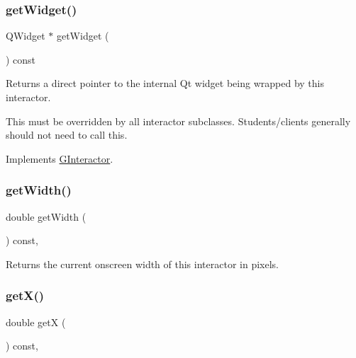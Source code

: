\subsubsection{\texorpdfstring{get\+Widget()}{getWidget()}}
{\footnotesize\ttfamily Q\+Widget $\ast$ get\+Widget (\begin{DoxyParamCaption}{ }\end{DoxyParamCaption}) const\hspace{0.3cm}{\ttfamily [virtual]}}



Returns a direct pointer to the internal Qt widget being wrapped by this interactor. 

This must be overridden by all interactor subclasses. Students/clients generally should not need to call this. 

Implements \mbox{\hyperlink{classGInteractor}{G\+Interactor}}.

\mbox{\label{classGInteractor_a0ed2965abd4f5701d2cadf71239faf19}} 
\subsubsection{\texorpdfstring{get\+Width()}{getWidth()}}
{\footnotesize\ttfamily double get\+Width (\begin{DoxyParamCaption}{ }\end{DoxyParamCaption}) const\hspace{0.3cm}{\ttfamily [virtual]}, {\ttfamily [inherited]}}



Returns the current onscreen width of this interactor in pixels. 

\mbox{\label{classGInteractor_a344385751bee0720059403940d57a13e}} 
\subsubsection{\texorpdfstring{get\+X()}{getX()}}
{\footnotesize\ttfamily double getX (\begin{DoxyParamCaption}{ }\end{DoxyParamCaption}) const\hspace{0.3cm}{\ttfamily [virtual]}, {\ttfamily [inherited]}}



